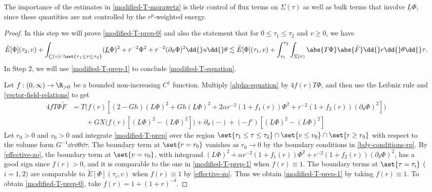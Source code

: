 \documentclass[10pt, reqno]{amsart}
\begin{document}
\begin{remark}
The importance of the estimates in \cref{modified-T-morawetz} is their control of
flux terms on \(\Sigma{}(\tau{})\) as well as bulk terms that involve
\(\underline{L}\Phi{}\), since these quantities are not controlled by the
\(r^p\)-weighted energy.
\end{remark}
\begin{proof}
 In this step we will prove \cref{modified-T-prep-0} and
also the statement that for \(0\le \tau_1\le \tau_2\)
and \(v\ge 0\), we have
\begin{equation}\label{modified-T-prep-1}
\tilde{E}[\Phi{}](\tau_2,v) + \int _{\underline{C}(v)\cap \set{\tau{}_1\le \tau{}\le \tau{}_2}}(\underline{L}\Phi{})^2 + r^{-2}\Phi^2 + r^{-2}(\partial{}_{\theta{}}\Phi{})^2 \dd{}u\dd{}\theta{}\lesssim \tilde{E}[\Phi{}](\tau_1,v) + \int_{\tau_1}^{\tau_2} \int _{\Sigma{}(\tau{})} \abs{T\Phi{}}\abs{\tilde{F}}\dd{}r\dd{}\theta{}\dd{}\tau{}.
\end{equation}
In Step 2, we will use \cref{modified-T-prep-1} to conclude
\cref{modified-T-equation}.

Let \(f:(0,\infty)\to \R_{>0}\) be a bounded non-increasing \(C^1\) function.
Multiply \cref{alpha-equation} by \(4f(r)T\Phi{}\), and then use the Leibniz rule and
\cref{vector-field-relations} to get
\begin{equation}\label{modified-T-prep}
\begin{split}
4fT\Phi{}\tilde{F}  &= T\bigl(f(r)[(2-Gh)(L\Phi{})^2 + Gh(\underline{L}\Phi{})^2 + 2\alpha{}r^{-2}(1+f_1(r))\Phi^2 + r^{-2}(1+f_2(r))(\partial{}_\theta\Phi{})^2]\bigr) \\
&\qquad + GX\bigl(f(r)[(\underline{L}\Phi{})^2 - (L\Phi{})^2]\bigr) + \partial{}_\theta{}(\cdots{}) + (-f')[(\underline{L}\Phi{})^2 - (L\Phi{})^2]
\end{split}
\end{equation}
Let \(r_0 > 0\) and \(v_0 > 0\) and integrate \cref{modified-T-prep} over the
region \(\set{\tau_1\le \tau{}\le \tau_2}\cap \set{v\le v_0}\cap \set{r\ge
r_0}\) with respect to the volume form \(G^{-1}\dd{}r\dd{}\theta{}\dd{}\tau{}\).
The boundary term at \(\set{r=r_0}\) vanishes as \(r_0\to 0\) by the boundary
conditions in \cref{bdy-conditions-rp}. By \cref{effective-zo}, the boundary
term at \(\set{v=v_0}\), with integrand \((L\Phi{})^2 +
\alpha{}r^{-2}(1+f_1(r))\Phi^2 +
r^{-2}(1+f_2(r))(\partial{}_{\theta{}}\Phi{})^2\), has a good sign since \(f(r)
> 0\), and it is comparable to the one in \cref{modified-T-prep-1} when
\(f(r)\equiv 1\). The boundary terms at \(\set{\tau{}=\tau_i}\) (\(i = 1,2\))
are comparable to \(\tilde{E}[\Phi{}](\tau_i,v)\) when \(f(r)\equiv 1\) by
\cref{effective-zo}. Thus we obtain \cref{modified-T-prep-1} by taking \(f(r)\equiv
1\). To obtain \cref{modified-T-prep-0}, take \(f(r)=1 + (1+r)^{-\delta{}}\).


\end{proof}
\end{document}
